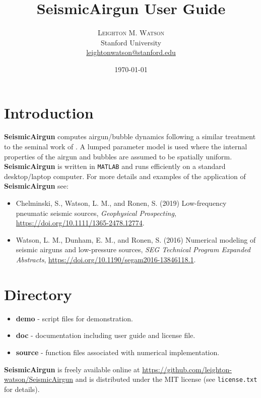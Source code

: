 \documentclass[10pt]{article}
\title{SeismicAirgun User Guide} %
\author{%
\textsc{Leighton M. Watson} \\%
\normalsize Stanford University \\ %
\normalsize \href{mailto:leightonwatson@stanford.edu}{leightonwatson@stanford.edu} %
}
\date{\today} %
\begin{document}
\maketitle


\section{Introduction}
{\bf SeismicAirgun} computes airgun/bubble dynamics following a similar treatment to the seminal work of \citet{Ziolkowski1970}. A lumped parameter model is used where the internal properties of the airgun and bubbles are assumed to be spatially uniform. {\bf SeismicAirgun} is written in \texttt{MATLAB} and runs efficiently on a standard desktop/laptop computer. For more details and examples of the application of {\bf SeismicAirgun} see:
\begin{itemize}
\item Chelminski, S., Watson, L. M., and Ronen, S. (2019) Low-frequency pneumatic seismic sources, \emph{Geophysical Prospecting}, \href{https://doi.org/10.1111/1365-2478.12774}{https://doi.org/10.1111/1365-2478.12774}.
\item Watson, L. M., Dunham, E. M., and Ronen, S. (2016) Numerical modeling of seismic airguns and low-pressure sources, \emph{SEG Technical Program Expanded Abstracts}, \href{https://doi.org/10.1190/segam2016-13846118.1}{https://doi.org/10.1190/\-segam2016-13846118.1}.
\end{itemize}

\section{Directory}
\begin{itemize}
\item {\bf demo} - script files for demonstration.
\item {\bf doc} - documentation including user guide and license file.
\item{\bf source} - function files associated with numerical implementation. 
\end{itemize}

{\bf SeismicAirgun} is freely available online at \href{https://github.com/leighton-watson/SeismicAirgun}{https://github.com/leighton-watson/SeismicAirgun} and is distributed under the MIT license (see \texttt{license.txt} for details). 
\end{document}
